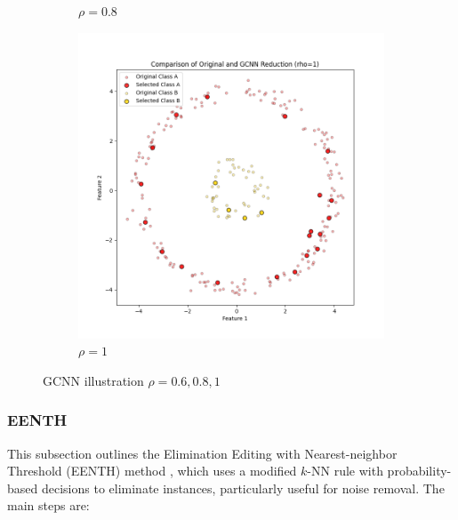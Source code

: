 \begin{figure}[ht]
\begin{subfigure}[b]{0.3\textwidth}
		\caption{$\rho = 0.8$}
		\label{fig:rho0.8}
	\end{subfigure}
	\hfill
	\begin{subfigure}[b]{0.3\textwidth}
		\centering
		\includegraphics[width=\textwidth]{figures/gcnn/comparison_plot_rho_1.png} %
		\caption{$\rho = 1$}
		\label{fig:rho1}
	\end{subfigure}
	\caption{GCNN illustration $\rho=0.6,0.8,1$}
	\label{fig:rho_variation_2}
\end{figure}

\subsubsection{EENTH}
This subsection outlines the Elimination Editing with Nearest-neighbor Threshold (EENTH) method \cite{vazquez2005}, which uses a modified $k$-NN rule with probability-based decisions to eliminate instances, particularly useful for noise removal. The main steps are:

